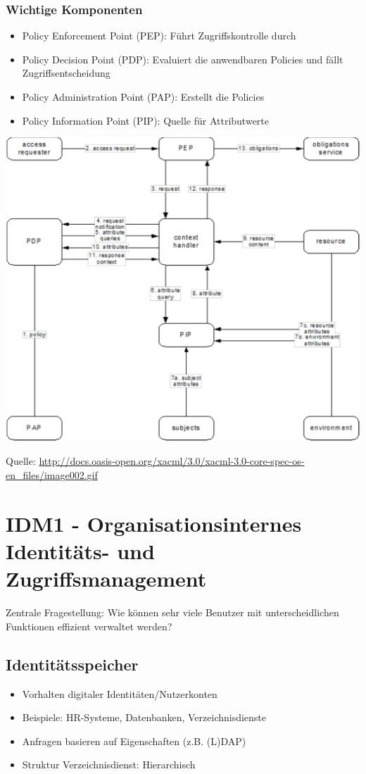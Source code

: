 \subsubsection{Wichtige Komponenten}
\begin{itemize}
	\item Policy Enforcement Point (PEP): Führt Zugriffskontrolle durch
	\item Policy Decision Point (PDP): Evaluiert die anwendbaren Policies und fällt Zugriffsentscheidung
	\item Policy Administration Point (PAP): Erstellt die Policies
	\item Policy Information Point (PIP): Quelle für Attributwerte
\end{itemize}

\includegraphics[scale=0.68]{it_sicherheitsmanagement/xacml.pdf}

Quelle: \url{http://docs.oasis-open.org/xacml/3.0/xacml-3.0-core-spec-os-en_files/image002.gif}



\section{IDM1 - Organisationsinternes Identitäts- und Zugriffsmanagement}
Zentrale Fragestellung: Wie können sehr viele Benutzer mit unterscheidlichen Funktionen effizient verwaltet werden?

\subsection{Identitätsspeicher}
\begin{itemize}
	\item Vorhalten digitaler Identitäten/Nutzerkonten
	\item Beispiele: HR-Systeme, Datenbanken, Verzeichnisdienste
	\item Anfragen basieren auf Eigenschaften (z.B. (L)DAP)
	\item Struktur Verzeichnisdienst: Hierarchisch
\end{itemize}



